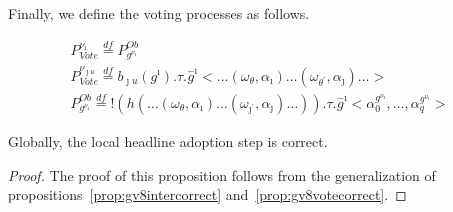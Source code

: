 Finally, we define the voting processes as follows.

\begin{equation} 
	\label{eq:pvivote11}
	\begin{gathered}
		P^{\nu_\imath}_{Vote}\overset{df}{=}P_{g^{\nu_\imath}}^{Ob}\\
		P^{\nu_{\jmath u}}_{Vote}\overset{df}{=}b_{\jmath u}(g^\imath).\tau.\overset{-}{g}^\imath<\ldots(\omega_\theta, \alpha_\imath)\ldots(\omega_{\theta^\prime}, \alpha_\jmath)\ldots>\\
		P_{g^{\nu_\imath}}^{Ob}\overset{df}{=}!(h(\ldots(\omega_\theta, \alpha_\imath)\ldots(\omega_{\jmath^\prime}, \alpha_\jmath)\ldots)).\tau.\overset{-}{g}^\imath<\alpha_0^{g^{\nu_\imath}}, \ldots,
		\alpha_q^{g^{\nu_\imath}}>
	\end{gathered}
\end{equation}

\begin{proposition}
	\label{prop:genercor}
	Globally, the local headline adoption  step is correct.
\end{proposition}

\begin{proof}
	The proof of this proposition follows from the generalization of propositions~\ref{prop:gv8intercorrect} and~\ref{prop:gv8votecorrect}.
\end{proof}


